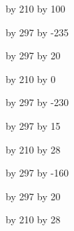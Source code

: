 

\setlength{\textwidth}{14cm}
\setlength{\oddsidemargin}{1cm}

%

\thispagestyle{empty}


\newcount \Z
{}


\newlength{\numhpclogox}
\setlength{\numhpclogox}{\paperwidth} %
\divide\numhpclogox by 210
\multiply\numhpclogox by 100

\newlength{\numhpclogoy}
\setlength{\numhpclogoy}{\paperheight} %
\divide \numhpclogoy by 297
\multiply \numhpclogoy by -235

\newlength{\numhpclogoheight}
\setlength{\numhpclogoheight}{\paperheight} %
\divide\numhpclogoheight by 297
\multiply\numhpclogoheight by 20

\newlength{\kitlogox}
\setlength{\kitlogox}{\paperwidth} %
\divide\kitlogox by 210
\multiply\kitlogox by 0

\newlength{\kitlogoy}
\setlength{\kitlogoy}{\paperheight} %
\divide \kitlogoy by 297
\multiply \kitlogoy by -230

\newlength{\kitlogoheight}
\setlength{\kitlogoheight}{\paperheight} %
\divide\kitlogoheight by 297
\multiply\kitlogoheight by 15


\newlength{\emcllogox}
\setlength{\emcllogox}{\paperwidth} %
\divide\emcllogox by 210
\multiply\emcllogox by 28

\newlength{\emcllogoy}
\setlength{\emcllogoy}{\paperheight} %
\divide \emcllogoy by 297
\multiply \emcllogoy by -160

\newlength{\emcllogoheight}
\setlength{\emcllogoheight}{\paperheight} %
\divide\emcllogoheight by 297
\multiply\emcllogoheight by 20

\newlength{\hiflowlogox}
\setlength{\hiflowlogox}{\paperwidth} %
\divide\hiflowlogox by 210
\multiply\hiflowlogox by 28

